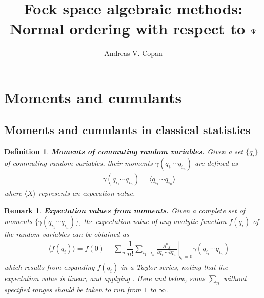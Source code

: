 \documentclass[11pt,fleqn]{article}
\author{Andreas V. Copan}
\date{}
\title{Fock space algebraic methods:\\Normal ordering with respect to $\Psi$}
\newcommand{\g}{\gamma}      %
\newcommand{\cd}{\ensuremath{\cdots}}
\newcommand{\bmit}[1]{{\bfseries\itshape\mathversion{bold}#1}}
\newcommand{\fr}[2]{\ensuremath{\dfrac{#1}{#2}}}
\newcommand{\pd}[2]{\ensuremath{\frac{\partial#1}{\partial#2}}}
\newcommand{\pt}{\ensuremath{\partial}}
\newcommand{\ip}[1]{\ensuremath{\langle#1\rangle}}
\theoremstyle{mystyle}
\newtheorem{dfn}{Definition}[section]
\newtheorem{rmk}{Remark}[section]
\numberwithin{equation}{section}
\begin{document}
\maketitle

\section{Moments and cumulants}

\subsection{Moments and cumulants in classical statistics}

\begin{dfn}
\label{moments-dfn}
\bmit{Moments of commuting random variables.}
Given a set $\{q_i\}$ of commuting random variables, their \textit{moments} $\g(q_{i_1}\cd q_{i_n})$ are defined as
\begin{align}
\label{moments}
&&
  \g(q_{i_1}\cd q_{i_n})
=
  \ip{q_{i_1}\cd q_{i_n}}
\end{align}
where $\ip{X}$ represents an expecation value.
\end{dfn}

\begin{rmk}
\label{classical-moment-expansion}
\bmit{Expectation values from moments.}
Given a complete set of moments $\{\g(q_{i_1}\cd q_{i_n})\}$, the expectation value of any analytic function $f(q_i)$ of the random variables can be obtained as
\begin{align}
&&
  \ip{f(q_i)}
=
  f(0)
+
  \sum_n
  \fr{1}{n!}
  \sum_{i_1\cd i_n}
  \left.
  \pd{^n f}{q_{i_1}\cd \pt q_{i_n}}
  \right|_{q_i=0}
  \g(q_{i_1}\cd q_{i_n})
\end{align}
which results from expanding $f(q_i)$ in a Taylor series, noting that the expectation value is linear, and applying .
Here and below, sums $\sum_n$ without specified ranges should be taken to run from $1$ to $\infty$.
\end{rmk}
\end{document}
